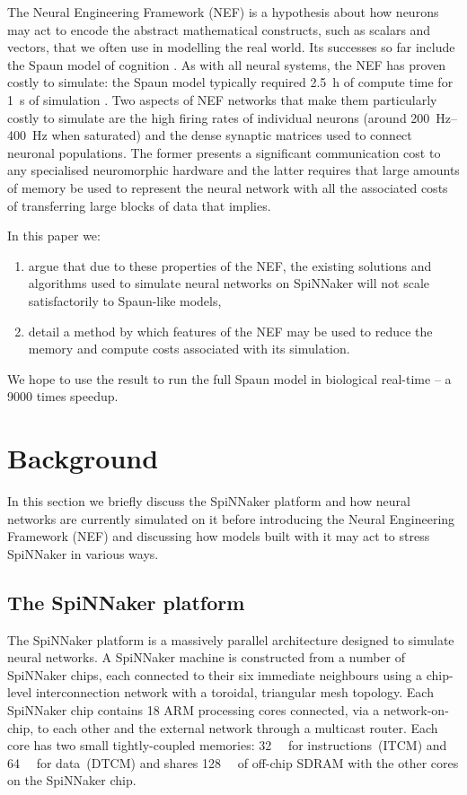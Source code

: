 \documentclass[conference]{IEEEtran}
\begin{document}
The Neural Engineering Framework (NEF) \parencite{Eliasmith2004} is a hypothesis about how neurons may act to encode the abstract mathematical constructs, such as scalars and vectors, that we often use in modelling the real world.
Its successes so far include the Spaun model of cognition \parencite{Eliasmith2012}.
As with all neural systems, the NEF has proven costly to simulate: the Spaun model typically required \SI{2.5}{\hour} of compute time for \SI{1}{\second} of simulation \parencite[\S V]{Stewart2014}.
Two aspects of NEF networks that make them particularly costly to simulate are the high firing rates of individual neurons (around \SIrange{200}{400}{\hertz} when saturated) and the dense synaptic matrices used to connect neuronal populations.
The former presents a significant communication cost to any specialised neuromorphic hardware and the latter requires that large amounts of memory be used to represent the neural network with all the associated costs of transferring large blocks of data that implies.

  In this paper we:
  \begin{enumerate}
    \item argue that due to these properties of the NEF, the existing solutions and algorithms used to simulate neural networks on SpiNNaker will not scale satisfactorily to Spaun-like models,
    \item detail a method by which features of the NEF may be used to reduce the memory and compute costs associated with its simulation.
  \end{enumerate}

We hope to use the result to run the full Spaun model in biological real-time -- a \num{9000} times speedup.

  \section{Background}

In this section we briefly discuss the SpiNNaker platform and how neural networks are currently simulated on it before introducing the Neural Engineering Framework (NEF) and discussing how models built with it may act to stress SpiNNaker in various ways.

  \subsection{The SpiNNaker platform}

The SpiNNaker platform is a massively parallel architecture designed to simulate neural networks. A SpiNNaker machine is constructed from a number of SpiNNaker chips, each connected to their six immediate neighbours using a chip-level interconnection network with a toroidal, triangular mesh topology. Each SpiNNaker chip contains 18 ARM processing cores connected, via a network-on-chip, to each other and the external network through a multicast router. Each core has two small tightly-coupled memories: \SI{32}{\kibi\byte} for instructions~(ITCM) and \SI{64}{\kibi\byte} for data~(DTCM) and shares \SI{128}{\mebi\byte} of off-chip SDRAM with the other cores on the SpiNNaker chip.
\end{document}
